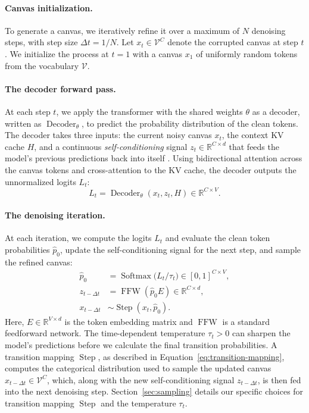 \documentclass[11pt, a4paper, logo, copyright, gdm]{google}
\newcommand{\dec}{\operatorname{Decoder}_{\theta}}
\newcommand{\softmax}{\operatorname{Softmax}}
\newcommand{\Vcal}{\mathcal{V}}
\newcommand{\step}{\operatorname{Step}}
\begin{document}
\paragraph{Canvas initialization.} To generate a canvas, we iteratively refine it over a maximum of $N$ denoising steps, with step size $\Delta t = 1 / N$. Let $x_t \in \Vcal^C$ denote the corrupted canvas at step $t$. We initialize the process at $t=1$ with a canvas $x_1$ of uniformly random tokens from the vocabulary $\Vcal$. 

\paragraph{The decoder forward pass.} At each step $t$, we apply the transformer with the shared weights $\theta$ as a decoder, written as $\dec$, to predict the probability distribution of the clean tokens. The decoder takes three inputs: the current noisy canvas $x_t$, the context KV cache $H$, and a continuous \textit{self-conditioning} signal $z_t \in \mathbb{R}^{C \times d}$ that feeds the model's previous predictions back into itself \citep{chen2023analog, strudel2022self, jo2026loopholing}. Using bidirectional attention across the canvas tokens and cross-attention to the KV cache, the decoder outputs the unnormalized logits $L_t$:
\begin{equation} \label{eq:denoising-forward-pass}
    L_t = \dec(x_t, z_t, H) \in \mathbb{R}^{C \times V}.
\end{equation}

\paragraph{The denoising iteration.} At each iteration, we compute the logits $L_t$ and evaluate the clean token probabilities $\hat{p}_0$, update the self-conditioning signal for the next step, and sample the refined canvas:
\begin{equation} \label{eq:denoising-iteration}
\begin{aligned} 
    \hat{p}_0 &= \softmax \big(L_t/\tau_t\big) \in [0, 1]^{C \times V}, \\
    z_{t-\Delta t} &= \operatorname{FFW}(\hat{p}_0 E) \in \mathbb{R}^{C \times d},
    \\
    x_{t-\Delta t} &\sim \operatorname{Step}(x_t, \hat{p}_0).
\end{aligned}
\end{equation}
Here, $E \in \mathbb{R}^{V \times d}$ is the token embedding matrix and $\operatorname{FFW}$ is a standard feedforward network. The time-dependent temperature $\tau_t > 0$ can sharpen the model's predictions before we calculate the final transition probabilities. A transition mapping $\step$, as described in Equation~\eqref{eq:transition-mapping}, computes the categorical distribution used to sample the updated canvas $x_{t-\Delta t}  \in \Vcal^C$, which, along with the new self-conditioning signal $z_{t-\Delta t}$, is then fed into the next denoising step.
Section~\ref{sec:sampling} details our specific choices for transition mapping $\step$ and the temperature $\tau_t$.
\end{document}
